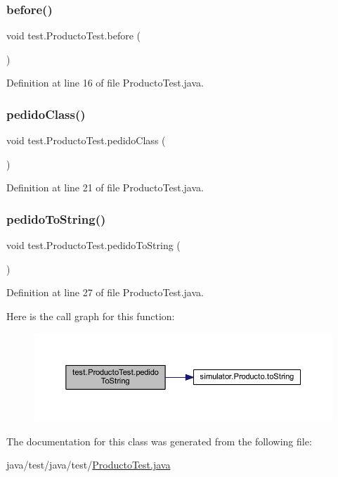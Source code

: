 \subsubsection{\texorpdfstring{before()}{before()}}
{\footnotesize\ttfamily void test.\+Producto\+Test.\+before (\begin{DoxyParamCaption}{ }\end{DoxyParamCaption})}



Definition at line 16 of file Producto\+Test.\+java.

\mbox{\label{classtest_1_1_producto_test_ae7f0a17e46f738f4d5bdd4115ffdbff1}} 
\subsubsection{\texorpdfstring{pedido\+Class()}{pedidoClass()}}
{\footnotesize\ttfamily void test.\+Producto\+Test.\+pedido\+Class (\begin{DoxyParamCaption}{ }\end{DoxyParamCaption})}



Definition at line 21 of file Producto\+Test.\+java.

\mbox{\label{classtest_1_1_producto_test_aa7c9f6941160c893d9833c67bf37884b}} 
\subsubsection{\texorpdfstring{pedido\+To\+String()}{pedidoToString()}}
{\footnotesize\ttfamily void test.\+Producto\+Test.\+pedido\+To\+String (\begin{DoxyParamCaption}{ }\end{DoxyParamCaption})}



Definition at line 27 of file Producto\+Test.\+java.

Here is the call graph for this function\+:\nopagebreak
\begin{figure}[H]
\begin{center}
\leavevmode
\includegraphics[width=350pt]{classtest_1_1_producto_test_aa7c9f6941160c893d9833c67bf37884b_cgraph}
\end{center}
\end{figure}


The documentation for this class was generated from the following file\+:\begin{DoxyCompactItemize}
\item 
java/test/java/test/\mbox{\hyperlink{_producto_test_8java}{Producto\+Test.\+java}}\end{DoxyCompactItemize}
